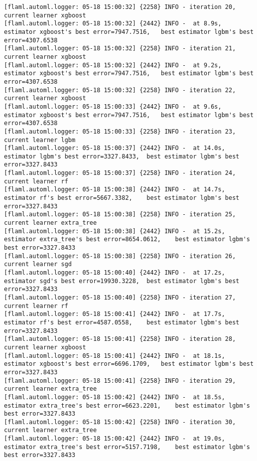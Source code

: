 \documentclass[
  letterpaper,
  DIV=11,
  numbers=noendperiod]{scrreprt}
\begin{document}
\begin{verbatim}
[flaml.automl.logger: 05-18 15:00:32] {2258} INFO - iteration 20, current learner xgboost
[flaml.automl.logger: 05-18 15:00:32] {2442} INFO -  at 8.9s,   estimator xgboost's best error=7947.7516,   best estimator lgbm's best error=4307.6538
[flaml.automl.logger: 05-18 15:00:32] {2258} INFO - iteration 21, current learner xgboost
[flaml.automl.logger: 05-18 15:00:32] {2442} INFO -  at 9.2s,   estimator xgboost's best error=7947.7516,   best estimator lgbm's best error=4307.6538
[flaml.automl.logger: 05-18 15:00:32] {2258} INFO - iteration 22, current learner xgboost
[flaml.automl.logger: 05-18 15:00:33] {2442} INFO -  at 9.6s,   estimator xgboost's best error=7947.7516,   best estimator lgbm's best error=4307.6538
[flaml.automl.logger: 05-18 15:00:33] {2258} INFO - iteration 23, current learner lgbm
[flaml.automl.logger: 05-18 15:00:37] {2442} INFO -  at 14.0s,  estimator lgbm's best error=3327.8433,  best estimator lgbm's best error=3327.8433
[flaml.automl.logger: 05-18 15:00:37] {2258} INFO - iteration 24, current learner rf
[flaml.automl.logger: 05-18 15:00:38] {2442} INFO -  at 14.7s,  estimator rf's best error=5667.3382,    best estimator lgbm's best error=3327.8433
[flaml.automl.logger: 05-18 15:00:38] {2258} INFO - iteration 25, current learner extra_tree
[flaml.automl.logger: 05-18 15:00:38] {2442} INFO -  at 15.2s,  estimator extra_tree's best error=8654.0612,    best estimator lgbm's best error=3327.8433
[flaml.automl.logger: 05-18 15:00:38] {2258} INFO - iteration 26, current learner sgd
[flaml.automl.logger: 05-18 15:00:40] {2442} INFO -  at 17.2s,  estimator sgd's best error=19930.3228,  best estimator lgbm's best error=3327.8433
[flaml.automl.logger: 05-18 15:00:40] {2258} INFO - iteration 27, current learner rf
[flaml.automl.logger: 05-18 15:00:41] {2442} INFO -  at 17.7s,  estimator rf's best error=4587.0558,    best estimator lgbm's best error=3327.8433
[flaml.automl.logger: 05-18 15:00:41] {2258} INFO - iteration 28, current learner xgboost
[flaml.automl.logger: 05-18 15:00:41] {2442} INFO -  at 18.1s,  estimator xgboost's best error=6696.1709,   best estimator lgbm's best error=3327.8433
[flaml.automl.logger: 05-18 15:00:41] {2258} INFO - iteration 29, current learner extra_tree
[flaml.automl.logger: 05-18 15:00:42] {2442} INFO -  at 18.5s,  estimator extra_tree's best error=6623.2201,    best estimator lgbm's best error=3327.8433
[flaml.automl.logger: 05-18 15:00:42] {2258} INFO - iteration 30, current learner extra_tree
[flaml.automl.logger: 05-18 15:00:42] {2442} INFO -  at 19.0s,  estimator extra_tree's best error=5157.7198,    best estimator lgbm's best error=3327.8433

\end{verbatim}
\end{document}
